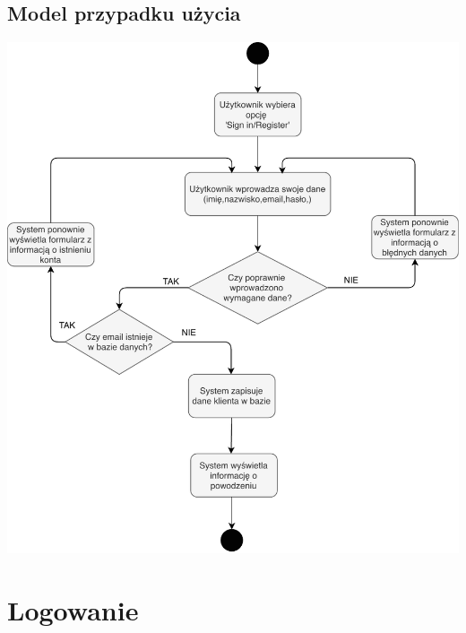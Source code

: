 \documentclass[10pt]{report}
\begin{document}
		\subsection{Model przypadku użycia}
		\begin{center}
			\includegraphics[width=400pt]{rejstracja.pdf}
		\end{center}

	
	 


	\newpage 
	\section{Logowanie}
	
	
\end{document}
